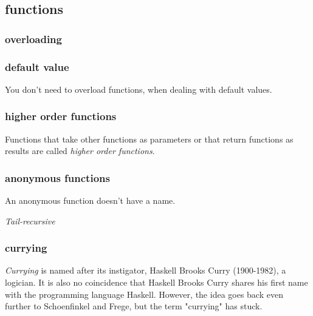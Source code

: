 \documentclass[12pt]{article}
\begin{document}
\subsection{functions}

\subsubsection{overloading}




\subsubsection{default value}

You don't need to overload functions, when dealing with default values.




\subsubsection{higher order functions}

Functions that take other functions as parameters or that return functions as results are called \textit{higher order functions}.




\subsubsection{anonymous functions}

An anonymous function doesn't have a name.

\textit{Tail-recursive}





\subsubsection{currying}

\textit{Currying} is named after its instigator, Haskell Brooks Curry (1900-1982), a logician. It is also no coincidence that Haskell Brooks Curry shares his first name with the programming language Haskell. However, the idea goes back even further to Schoenfinkel and Frege, but the term "currying" has stuck. 
\end{document}

